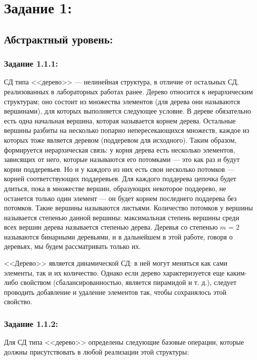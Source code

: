 \documentclass[12pt]{article}
\begin{document}
	\setcounter{secnumdepth}{-1} 
	\tableofcontents
	\newpage
	
	{\parskip=0.15cm
	
	\section{Задание 1:}
	\label{task_1}
	
	\subsection{Абстрактный уровень:}
	\label{task_1_1}
	\subsubsection{Задание 1.1.1:}
	\label{task_1_1_1}
	
	СД типа <<дерево>> --- нелинейная структура, в отличие от остальных СД, реализованных в лабораторных работах ранее. Дерево относится к иерархическим структурам; оно состоит из множества элементов (для дерева они называются вершинами), для которых выполняется следующее условие. В дереве обязательно есть одна начальная вершина, которая называется корнем дерева. Остальные вершины разбиты на несколько попарно непересекающихся множеств, каждое из которых тоже является деревом (поддеревом для исходного). Таким образом, формируется иерархическая связь: у корня дерева есть несколько элементов, зависящих от него, которые называются его потомками --- это как раз и будут корни поддеревьев. Но и у каждого из них есть свои несколько потомков --- корней соответствующих поддеревьев. Для каждого поддерева цепочка будет длиться, пока в множестве вершин, образующих некоторое поддерево, не останется только один элемент --- он будет корнем последнего поддерева без потомков. Такие вершины называются листьями. Количество потомков у вершины называется степенью данной вершины: максимальная степень вершины среди всех вершин дерева называется степенью дерева. Деревья со степенью $m$ = 2 называются бинарными деревьями, и в дальнейшем в этой работе, говоря о деревьях, мы будем рассматривать только их.
	
	<<Дерево>> является динамической СД: в ней могут меняться как сами элементы, так и их количество. Однако если дерево характеризуется еще каким-либо свойством (сбалансированностью, является пирамидой и т. д.), следует проводить добавление и удаление элементов так, чтобы сохранялось этой свойство. 
	
	\subsubsection{Задание 1.1.2:}
	\label{task_1_1_2}
	Для СД типа <<дерево>> определены следующие базовые операции, которые должны присутствовать в любой реализации этой структуры:
	
}
\end{document}
